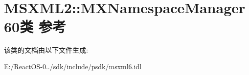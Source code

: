 \hypertarget{class_m_s_x_m_l2_1_1_m_x_namespace_manager60}{}\section{M\+S\+X\+M\+L2\+:\+:M\+X\+Namespace\+Manager60类 参考}
\label{class_m_s_x_m_l2_1_1_m_x_namespace_manager60}


该类的文档由以下文件生成\+:\begin{DoxyCompactItemize}
\item 
E\+:/\+React\+O\+S-\/0../sdk/include/psdk/msxml6.\+idl\end{DoxyCompactItemize}
